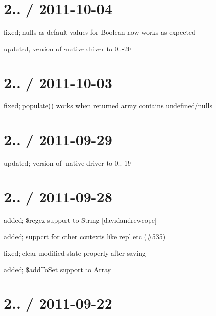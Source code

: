 \section*{2.. / 2011-\/10-\/04 }


\begin{DoxyItemize}
\item fixed; nulls as default values for Boolean now works as expected
\item updated; version of -\/native driver to 0..-\/20
\end{DoxyItemize}

\section*{2.. / 2011-\/10-\/03 }


\begin{DoxyItemize}
\item fixed; populate() works when returned array contains undefined/nulls
\end{DoxyItemize}

\section*{2.. / 2011-\/09-\/29 }


\begin{DoxyItemize}
\item updated; version of -\/native driver to 0..-\/19
\end{DoxyItemize}

\section*{2.. / 2011-\/09-\/28 }


\begin{DoxyItemize}
\item added; \$regex support to String \mbox{[}davidandrewcope\mbox{]}
\item added; support for other contexts like repl etc (\#535)
\item fixed; clear modified state properly after saving
\item added; \$add\+To\+Set support to Array
\end{DoxyItemize}

\section*{2.. / 2011-\/09-\/22 }


